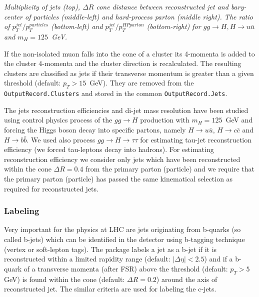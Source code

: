 \begin{Fighere}
\begin{center}
{}
\end{center}
\caption{\em
Multiplicity of jets (top), $\Delta R$ cone distance between reconstructed jet
and bary-center of particles (middle-left) and hard-process parton (middle right).
The ratio of $p_T^{jet}/p_T^{particles}$ (bottom-left) and
$p_T^{jet}/p_T^{HP parton}$ (bottom-right) for $gg \to H, H \to u \bar u$ and 
$m_{H} = 125$~GeV.
\label{FS2:5}} 
\end{Fighere}
\newpage


 If the non-isolated muon falls into the cone of a
cluster its 4-momenta  is added to the cluster 4-momenta and the
cluster direction is recalculated.
The resulting clusters are classified as jets if their transverse momentum
is greater than a given threshold (default: $p_T > 15$~GeV).
They are removed from the  {\tt OutputRecord.Clusters} and stored in the 
common  {\tt OutputRecord.Jets}.

The jets reconstruction efficiencies and di-jet mass resolution
have been studied using control physics process of the $gg \to H$ production
with $m_H=125$~GeV and forcing the Higgs boson decay into specific
partons, namely $H \to u \bar u$, $H \to c \bar c$  and $H \to b \bar b$.
We used also process $gg \to H \to \tau \tau$ for estimating tau-jet
reconstruction efficiency (we forced tau-leptons decay into hadrons).
For estimating reconstruction efficiency we consider only jets which
have been reconstructed within the cone $\Delta R = 0.4$ from the
primary parton (particle) and we require that the primary parton
(particle) has passed
the same kinematical selection as required for reconstructed jets.

\boldmath 
\subsubsection{Labeling}
\unboldmath

Very important for the physics at LHC  are jets originating from b-quarks (so called
b-jets) which can be identified in the detector using b-tagging technique (vertex or
soft-lepton tags). The package labels a jet  as a b-jet if it is 
reconstructed within a limited rapidity
range (default: $|\Delta \eta| < 2.5$) and if a b-quark
of a transverse momenta (after FSR) above the threshold
(default: $p_T > 5$ GeV) is found within the cone 
(default: $\Delta R = 0.2$) around the axis of reconstructed jet.
The similar criteria are used for labeling the c-jets.

